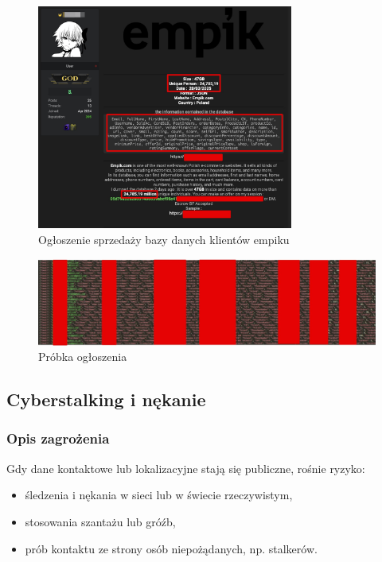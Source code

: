 \begin{figure}[H]
  \centering
  \includegraphics[width=0.75\textwidth]{images/empik-wyciek.jpg}
  \caption{Ogłoszenie sprzedaży bazy danych klientów empiku}
  \label{fig:empik}
\end{figure} 

\begin{figure}[H]
  \centering
  \includegraphics[width=1\textwidth]{images/probka.jpg}
  \caption{Próbka ogłoszenia}
  \label{fig:probka}
\end{figure} 

\subsection{Cyberstalking i nękanie}
\subsubsection{Opis zagrożenia}
Gdy dane kontaktowe lub lokalizacyjne stają się publiczne, rośnie ryzyko:
\begin{itemize}
\item śledzenia i nękania w sieci lub w świecie rzeczywistym,
\item stosowania szantażu lub gróźb,
\item prób kontaktu ze strony osób niepożądanych, np. stalkerów.
\end{itemize}
